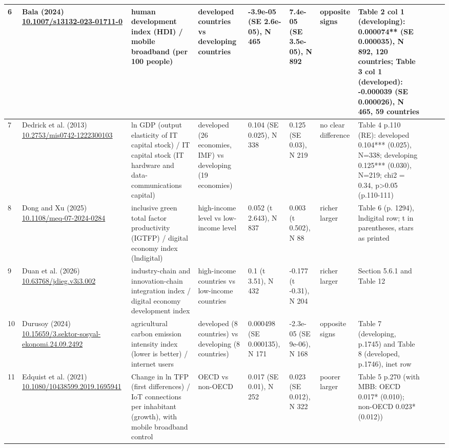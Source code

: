 \documentclass[10pt,a4paper]{article}
\begin{document}
\begin{longtable}{@{}p{0.4cm}p{2.4cm}p{2.6cm}p{3.0cm}p{2.6cm}p{2.6cm}p{1.5cm}p{5.6cm}p{0.3cm}p{1.0cm}p{1.6cm}@{}}
6 & Bala (2024) \newline \url{10.1007/s13132-023-01711-0} & human development index (HDI) / mobile broadband (per 100 people) & developed countries vs developing countries & -3.9e-05 (SE 2.6e-05), N 465 & 7.4e-05 (SE 3.5e-05), N 892 & opposite signs & Table 2 col 1 (developing): 0.000074** (SE 0.000035), N 892, 120 countries; Table 3 col 1 (developed): -0.000039 (SE 0.000026), N 465, 59 countries &  &  &  \\ \midrule
7 & Dedrick et al. (2013) \newline \url{10.2753/mis0742-1222300103} & ln GDP (output elasticity of IT capital stock) / IT capital stock (IT hardware and data-communications capital) & developed (26 economies, IMF) vs developing (19 economies) & 0.104 (SE 0.025), N 338 & 0.125 (SE 0.03), N 219 & no clear difference & Table 4 p.110 (RE): developed 0.104*** (0.025), N=338; developing 0.125*** (0.030), N=219; chi2 = 0.34, p>0.05 (p.110-111) &  &  &  \\ \midrule
8 & Dong and Xu (2025) \newline \url{10.1108/meq-07-2024-0284} & inclusive green total factor productivity (IGTFP) / digital economy index (lndigital) & high-income level vs low-income level & 0.052 (t 2.643), N 837 & 0.003 (t 0.502), N 88 & richer larger & Table 6 (p. 1294), lndigital row; t in parentheses, stars as printed &  &  &  \\ \midrule
9 & Duan et al. (2026) \newline \url{10.63768/jdieg.v3i3.002} & industry-chain and innovation-chain integration index / digital economy development index & high-income countries vs low-income countries & 0.1 (t 3.51), N 432 & -0.177 (t -0.31), N 204 & richer larger & Section 5.6.1 and Table 12 &  &  &  \\ \midrule
10 & Durusoy (2024) \newline \url{10.15659/3.sektor-sosyal-ekonomi.24.09.2492} & agricultural carbon emission intensity index (lower is better) / internet users & developed (8 countries) vs developing (8 countries) & 0.000498 (SE 0.000135), N 171 & -2.3e-05 (SE 9e-06), N 168 & opposite signs & Table 7 (developing, p.1745) and Table 8 (developed, p.1746), inet row &  &  &  \\ \midrule
11 & Edquist et al. (2021) \newline \url{10.1080/10438599.2019.1695941} & Change in ln TFP (first differences) / IoT connections per inhabitant (growth), with mobile broadband control & OECD vs non-OECD & 0.017 (SE 0.01), N 252 & 0.023 (SE 0.012), N 322 & poorer larger & Table 5 p.270 (with MBB: OECD 0.017* (0.010); non-OECD 0.023* (0.012)) &  &  &  \\ \midrule

\end{longtable}
\end{document}
